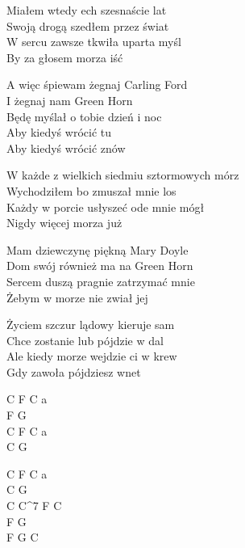 \begin{text}
   
    Miałem wtedy ech szesnaście lat\\
    Swoją drogą szedłem przez świat \\
    W sercu zawsze tkwiła uparta myśl \\
    By za głosem morza iść
	
    \vin A więc śpiewam żegnaj Carling Ford \\
    \vin I żegnaj nam Green Horn \\
    \vin Będę myślał o tobie dzień i noc \\
    \vin Aby kiedyś wrócić tu \\
    \vin Aby kiedyś wrócić znów 

    W każde z wielkich siedmiu sztormowych mórz\\
    Wychodziłem bo zmuszał mnie los\\
    Każdy w porcie usłyszeć ode mnie mógł\\
    Nigdy więcej morza już
	
    Mam dziewczynę piękną Mary Doyle\\
    Dom swój również ma na Green Horn\\
    Sercem duszą pragnie zatrzymać mnie\\
    Żebym w morze nie zwiał jej
	
    Życiem szczur lądowy kieruje sam\\
    Chce zostanie lub pójdzie w dal\\
    Ale kiedy morze wejdzie ci w krew\\
    Gdy zawoła pójdziesz wnet   

\end{text}
\begin{chord}
    C F C a\\
    F G\\
    C F C a\\
    C G
	
    \vin C F C a\\
    \vin C G \\
    \vin C C^7 F C\\
    \vin F G \\
    \vin F G C 
\end{chord}
